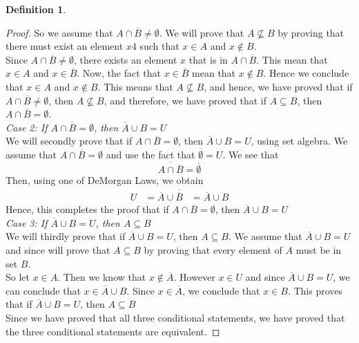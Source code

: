 \documentclass{book}
\theoremstyle{definition}
\newtheorem{definition}{Definition}[section]
\theoremstyle{remark}
\begin{document}
\begin{definition}
\begin{proof}
                So we assume that $A \cap \overline{B} \neq \emptyset$. We will prove that $A \nsubseteq B$ by proving that there must exist an element $x4$ such that $x \in A$ and $x \notin B$. \\
                
                Since $A \cap \overline{B} \neq \emptyset$, there exists an element $x$ that is in $A \cap \overline{B}$. This mean that $x \in A$ and $x \in \overline{B}$. Now, the fact that $x \in \overline{B}$ mean that $x \notin B$. Hence we conclude that $x \in A$ and $x \notin B$. This means that $A \nsubseteq B$, and hence, we have proved that if $A \cap \overline{B} \neq \emptyset$, then $A \nsubseteq B$, and therefore, we have proved that if $A \subseteq B$, then $A \cap \overline{B} = \emptyset$. \\
             
            \textit{Case 2: If $A \cap \overline{B} = \emptyset$, then $\overline{A} \cup B = U$} \\
                We will secondly prove that if $A \cap \overline{B} = \emptyset$, then $\overline{A} \cup B = U$, using set algebra. We assume that $A \cap \overline{B} = \emptyset$ and use the fact that $\overline{\emptyset} = U$. We see that 
                    \begin{equation*}
                        \overline{A \cap \overline{B}} = \overline{\emptyset}
                    \end{equation*}
                Then, using one of DeMorgan Laws, we obtain
                    \begin{align*}
                        U & = \overline{A} \cup \overline{\overline{B}}
                            & = \overline{A} \cup B
                    \end{align*}
                Hence, this completes the proof that if $A \cap \overline{B} = \emptyset$, then $\overline{A} \cup B = U$ \\
                    
            \textit{Case 3: If $\overline{A} \cup B = U$, then $A \subseteq B$} \\
                We will thirdly prove that if $\overline{A} \cup B = U$, then $A \subseteq B$. We assume that $\overline{A} \cup B = U$ and since will prove that $A \subseteq B$ by proving that every element of $A$ must be in set $B$. \\
                
                So let $x \in A$. Then we know that $x \notin \overline{A}$. However $x \in U$ and since $\overline{A} \cup B = U$, we can conclude that $x \in \overline{A} \cup B$. Since $x \in \overline{A}$, we conclude that $x \in B$. This proves that if $\overline{A} \cup B = U$, then $A \subseteq B$ \\
             
             Since we have proved that all three conditional statements, we have proved that the three conditional statements are equivalent. 
        \end{proof}
\end{definition}
\end{document}
